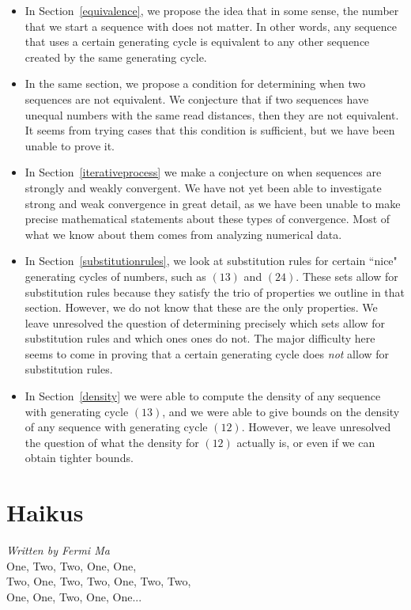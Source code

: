 \documentclass[runningheads,a4paper]{llncs}
\begin{document}
\begin{itemize}
\item In Section~\ref{equivalence}, we propose the idea that in some sense, the number that we start a sequence with does not matter. In other words, any sequence that uses a certain generating cycle is equivalent to any other sequence created by the same generating cycle.
\item In the same section, we propose a condition for determining when two sequences are not equivalent. We conjecture that if two sequences have unequal numbers with the same read distances, then they are not equivalent. It seems from trying cases that this condition is sufficient, but we have been unable to prove it.
\item In Section~\ref{iterativeprocess} we make a conjecture on when sequences are strongly and weakly convergent. We have not yet been able to investigate strong and weak convergence in great detail, as we have been unable to make precise mathematical statements about these types of convergence. Most of what we know about them comes from analyzing numerical data.
\item In Section~\ref{substitutionrules}, we look at substitution rules for certain ``nice" generating cycles of numbers, such as $(13)$ and $(24)$. These sets allow for substitution rules because they satisfy the trio of properties we outline in that section. However, we do not know that these are the only properties. We leave unresolved the question of determining precisely which sets allow for substitution rules and which ones ones do not. The major difficulty here seems to come in proving that a certain generating cycle does \emph{not} allow for substitution rules.
\item In Section~\ref{density} we were able to compute the density of any sequence with generating cycle $(13)$, and we were able to give bounds on the density of any sequence with generating cycle $(12)$. However, we leave unresolved the question of what the density for $(12)$ actually is, or even if we can obtain tighter bounds.
\end{itemize}

\section{Haikus}
\emph{Written by Fermi Ma}\\

\noindent One, Two, Two, One, One,\\
Two, One, Two, Two, One, Two, Two,\\
One, One, Two, One, One...\\
\end{document}

